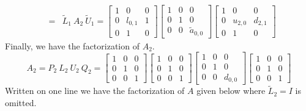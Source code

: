 \begin{eqnarray*}
& = &
{\tilde L}_1 \ A_2 \ {\tilde U}_1
=
\left \lbrack \begin{array}{ccc}
1 & 0 & 0 \\
0 & l_{0,1} & 1 \\
0 & 1 & 0
\end{array} \right \rbrack
\left \lbrack \begin{array}{ccc}
1 & 0 & 0 \\
0 & 1 & 0 \\
0 & 0 & {\tilde a}_{0,0}
\end{array} \right \rbrack
\left \lbrack \begin{array}{ccc}
1 & 0 & 0 \\
0 & u_{2,0} & d_{2,1} \\
0 & 1 & 0
\end{array} \right \rbrack
\end{eqnarray*}
Finally, we have the factorization of $A_2$.
$$
A_2 
= 
P_2 \ L_2 \ U_2 \ Q_2
=
\left \lbrack \begin{array}{ccc}
1 & 0 & 0 \\
0 & 1 & 0 \\
0 & 0 & 1
\end{array} \right \rbrack
\left \lbrack \begin{array}{ccc}
1 & 0 & 0 \\
0 & 1 & 0 \\
0 & 0 & 1
\end{array} \right \rbrack
\left \lbrack \begin{array}{ccc}
1 & 0 & 0 \\
0 & 1 & 0 \\
0 & 0 & d_{0,0}
\end{array} \right \rbrack
\left \lbrack \begin{array}{ccc}
1 & 0 & 0 \\
0 & 1 & 0 \\
0 & 0 & 1
\end{array} \right \rbrack
$$
Written on one line we have the factorization of $A$ given below
where ${\tilde L}_2 = I$ is omitted.
